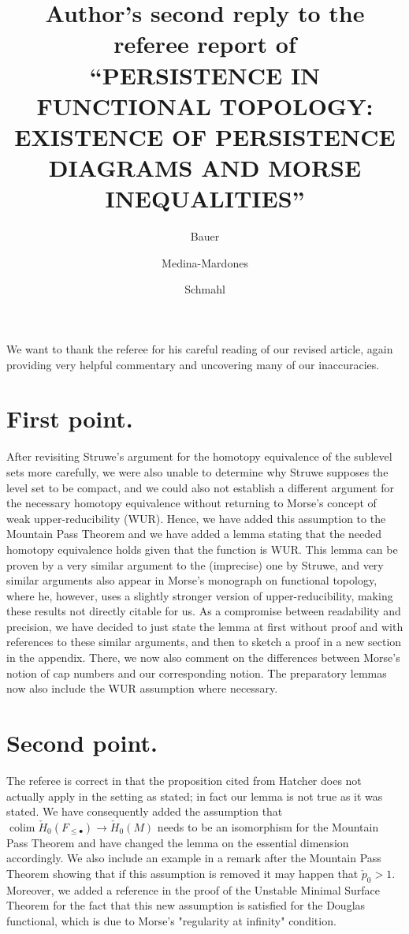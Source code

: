 \documentclass{article}
\title{Author's second reply to the referee report of \\ \textsc{
    ``PERSISTENCE IN FUNCTIONAL TOPOLOGY: EXISTENCE OF PERSISTENCE DIAGRAMS AND MORSE INEQUALITIES''
    }
}
\author{Bauer \and Medina-Mardones \and Schmahl}
\begin{document}
	\maketitle
	We want to thank the referee for his careful reading of our revised article, again providing very helpful commentary and uncovering many of our inaccuracies.
	
	\section{First point.}
	After revisiting Struwe's argument for the homotopy equivalence of the sublevel sets more carefully, we were also unable to determine why Struwe supposes the level set to be compact, and we could also not establish a different argument for the necessary homotopy equivalence without returning to Morse's concept of weak upper-reducibility (WUR). 
	Hence, we have added this assumption to the Mountain Pass Theorem and we have added a lemma stating that the needed homotopy equivalence holds given that the function is WUR.
	This lemma can be proven by a very similar argument to the (imprecise) one by Struwe, and very similar arguments also appear in Morse's monograph on functional topology, where he, however, uses a slightly stronger version of upper-reducibility, making these results not directly citable for us.
	As a compromise between readability and precision, we have decided to just state the lemma at first without proof and with references to these similar arguments, and then to sketch a proof in a new section in the appendix.
	There, we now also comment on the differences between Morse's notion of cap numbers and our corresponding notion.
	The preparatory lemmas now also include the WUR assumption where necessary.

	\section{Second point.}
	The referee is correct in that the proposition cited from Hatcher does not actually apply in the setting as stated; in fact our lemma is not true as it was stated.
	We have consequently added the assumption that $\operatorname{colim} \check{H}_0(F_{\leq \bullet}) \to \check{H}_0(M)$ needs to be an isomorphism for the Mountain Pass Theorem and have changed the lemma on the essential dimension accordingly.
	We also include an example in a remark after the Mountain Pass Theorem showing that if this assumption is removed it may happen that $\check{p}_0 > 1$.
	Moreover, we added a reference in the proof of the Unstable Minimal Surface Theorem for the fact that this new assumption is satisfied for the Douglas functional, which is due to Morse's "regularity at infinity" condition.
\end{document}

